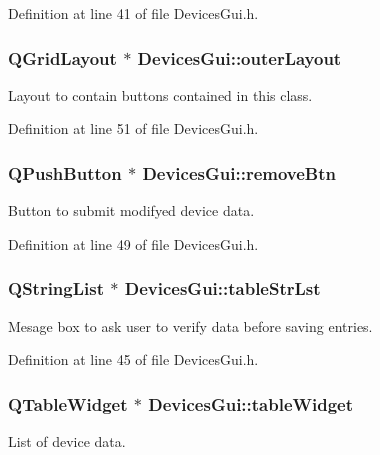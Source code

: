 Definition at line 41 of file Devices\-Gui.\-h.

\hypertarget{class_devices_gui_aef89fe012f81c1c16826e228fb0d5af4}{
\subsubsection[{outer\-Layout}]{\setlength{\rightskip}{0pt plus 5cm}Q\-Grid\-Layout $\ast$ Devices\-Gui\-::outer\-Layout\hspace{0.3cm}{\ttfamily [private]}}}\label{class_devices_gui_aef89fe012f81c1c16826e228fb0d5af4}
Layout to contain buttons contained in this class. 

Definition at line 51 of file Devices\-Gui.\-h.

\hypertarget{class_devices_gui_a43e4c21a58125035b095b4b64be349a0}{
\subsubsection[{remove\-Btn}]{\setlength{\rightskip}{0pt plus 5cm}Q\-Push\-Button $\ast$ Devices\-Gui\-::remove\-Btn\hspace{0.3cm}{\ttfamily [private]}}}\label{class_devices_gui_a43e4c21a58125035b095b4b64be349a0}
Button to submit modifyed device data. 

Definition at line 49 of file Devices\-Gui.\-h.

\hypertarget{class_devices_gui_a9207754164d2932897101377acd8a89b}{
\subsubsection[{table\-Str\-Lst}]{\setlength{\rightskip}{0pt plus 5cm}Q\-String\-List $\ast$ Devices\-Gui\-::table\-Str\-Lst\hspace{0.3cm}{\ttfamily [private]}}}\label{class_devices_gui_a9207754164d2932897101377acd8a89b}
Mesage box to ask user to verify data before saving entries. 

Definition at line 45 of file Devices\-Gui.\-h.

\hypertarget{class_devices_gui_a8215658b3b6f9fc25ec3c1d85ca01b8f}{
\subsubsection[{table\-Widget}]{\setlength{\rightskip}{0pt plus 5cm}Q\-Table\-Widget $\ast$ Devices\-Gui\-::table\-Widget\hspace{0.3cm}{\ttfamily [private]}}}\label{class_devices_gui_a8215658b3b6f9fc25ec3c1d85ca01b8f}
List of device data. 

